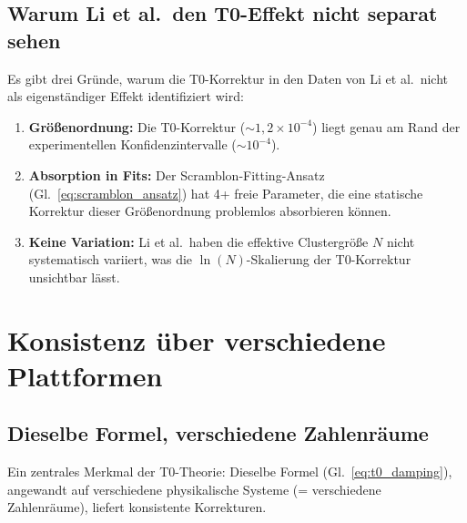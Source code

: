 \subsection{Warum Li et al.\ den T0-Effekt nicht separat sehen}

Es gibt drei Gründe, warum die T0-Korrektur in den Daten von Li et al.\ nicht als eigenständiger Effekt identifiziert wird:

\begin{enumerate}
	\item \textbf{Größenordnung:} Die T0-Korrektur ($\sim 1{,}2 \times 10^{-4}$) liegt genau am Rand der experimentellen Konfidenzintervalle ($\sim 10^{-4}$).
	\item \textbf{Absorption in Fits:} Der Scramblon-Fitting-Ansatz (Gl.~\ref{eq:scramblon_ansatz}) hat 4+ freie Parameter, die eine statische Korrektur dieser Größenordnung problemlos absorbieren können.
	\item \textbf{Keine Variation:} Li et al.\ haben die effektive Clustergröße $N$ nicht systematisch variiert, was die $\ln(N)$-Skalierung der T0-Korrektur unsichtbar lässt.
\end{enumerate}


\section{Konsistenz über verschiedene Plattformen}
\label{sec:crossplatform}

\subsection{Dieselbe Formel, verschiedene Zahlenräume}

Ein zentrales Merkmal der T0-Theorie: Dieselbe Formel (Gl.~\ref{eq:t0_damping}), angewandt auf verschiedene physikalische Systeme (= verschiedene Zahlenräume), liefert konsistente Korrekturen.

\begin{table}[h]
	\centering
	\caption{T0-Korrekturfaktor über verschiedene Plattformen}
	\label{tab:cross_platform}
\end{table}

